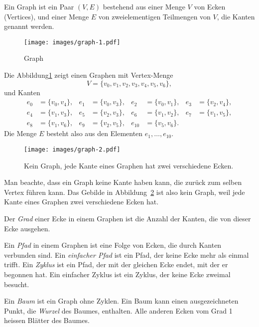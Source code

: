\begin{definition}
%
\label{def_graph}
Ein Graph ist ein Paar $(V,E)$ bestehend aus einer Menge $V$ von Ecken
(Vertices),
und einer Menge $E$ von zweielementigen Teilmengen von $V$, die Kanten
genannt werden.
\end{definition}

\begin{figure}
\begin{center}
\texttt{[image: images/graph-1.pdf]}
\end{center}
\caption{Graph\label{grundlagen:graph}}
\end{figure}
Die Abbildung\ref{grundlagen:graph} zeigt einen Graphen mit Vertex-Menge
\[
V=\{v_0,
v_1,
v_2,
v_3,
v_4,
v_5,
v_6\},
\]
und Kanten
\begin{align*}
e_0&=\{v_0,v_4\},&
e_1&=\{v_0,v_3\},&
e_2&=\{v_0,v_1\},&
e_3&=\{v_2,v_4\},
\\
e_4&=\{v_1,v_3\},&
e_5&=\{v_2,v_3\},&
e_6&=\{v_1,v_2\},&
e_7&=\{v_1,v_5\},
\\
e_8&=\{v_1,v_6\},&
e_9&=\{v_2,v_5\},&
e_{10}&=\{v_5,v_6\}.
\end{align*}
Die Menge $E$ besteht also aus den Elementen $e_1,\dots,e_{10}$.

\begin{figure}
\begin{center}
\texttt{[image: images/graph-2.pdf]}
\end{center}
\caption{Kein Graph, jede Kante eines Graphen hat zwei verschiedene
Ecken.\label{grundlagen:keingraph}}
\end{figure}
Man beachte, dass ein Graph keine Kante haben kann, die zurück zum 
selben Vertex führen kann.
Das Gebilde in Abbildung~\ref{grundlagen:keingraph}
ist also kein Graph, weil jede Kante eines Graphen zwei verschiedene
Ecken hat.

%
Der {\em Grad} einer Ecke in einem Graphen ist die Anzahl der Kanten,
die von dieser Ecke ausgehen.

%
Ein {\em Pfad} in einem Graphen ist eine Folge von Ecken, die durch Kanten
verbunden sind.
%
Ein {\em einfacher Pfad} ist ein Pfad, der keine Ecke mehr
als einmal trifft.
%
Ein {\em Zyklus} ist ein Pfad, der mit der gleichen Ecke
endet, mit der er begonnen hat.
%
Ein einfacher Zyklus ist ein Zyklus,
der keine Ecke zweimal besucht.

%
Ein {\em Baum} ist ein Graph ohne Zyklen. Ein Baum kann einen ausgezeichneten
Punkt, die {\em Wurzel} des Baumes, enthalten. Alle anderen Ecken vom Grad 1
%
heissen Blätter des Baumes.

